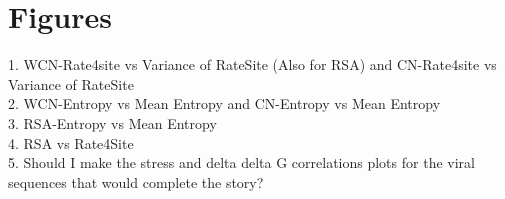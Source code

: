 \documentclass[12pt]{article}
\begin{document}



\section*{Figures}

1. WCN-Rate4site vs Variance of RateSite (Also for RSA) and CN-Rate4site vs Variance of RateSite \\
2. WCN-Entropy vs Mean Entropy  and CN-Entropy vs Mean Entropy \\
3. RSA-Entropy vs Mean Entropy \\
4. RSA vs Rate4Site \\
5. Should I make the stress  and delta delta G correlations plots for the viral sequences that would complete the story?

%
%
\end{document}
